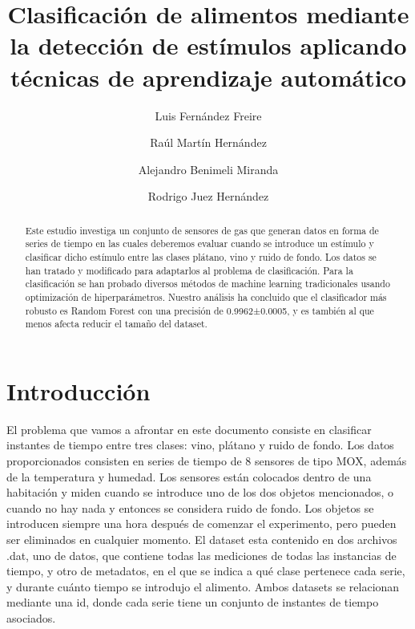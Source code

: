 \documentclass{esannV2}
\begin{document}
\title{Clasificación de alimentos mediante la detección de estímulos aplicando técnicas de aprendizaje automático}

\author{
Luis Fernández Freire \and
\qquad Raúl Martín Hernández\and
Alejandro Benimeli Miranda\and
Rodrigo Juez Hernández
%
%
\vspace{.3cm}}

\maketitle

\begin{abstract}
Este estudio investiga un conjunto de sensores de gas que generan datos en forma de series de tiempo en las cuales deberemos evaluar cuando se introduce un estímulo y clasificar dicho estímulo entre las clases plátano, vino y ruido de fondo. Los datos se han tratado y modificado para adaptarlos al problema de clasificación. Para la clasificación se han probado diversos métodos de machine learning tradicionales usando optimización de hiperparámetros. Nuestro análisis ha concluido que el clasificador más robusto es Random Forest con una precisión de 0.9962±0.0005, y es también al que menos afecta reducir el tamaño del dataset.
\end{abstract}
\section{Introducción}
El problema que vamos a afrontar en este documento consiste en clasificar instantes de tiempo entre tres clases: vino, plátano y ruido de fondo. Los datos proporcionados consisten en series de tiempo de 8 sensores de tipo MOX, además de la temperatura y humedad. Los sensores están colocados dentro de una habitación y miden cuando se introduce uno de los dos objetos mencionados, o cuando no hay nada y entonces se considera ruido de fondo. Los objetos se introducen siempre una hora después de comenzar el experimento, pero pueden ser eliminados en cualquier momento.
\newline\newline
El dataset \cite{dataset} esta contenido en dos archivos .dat, uno de datos, que contiene todas las mediciones de todas las instancias de tiempo, y otro de metadatos, en el que se indica a qué clase pertenece cada serie, y durante cuánto tiempo se introdujo el alimento. Ambos datasets se relacionan mediante una id, donde cada serie tiene un conjunto de instantes de tiempo asociados.\\
\end{document}
